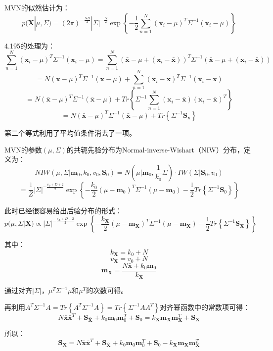 \documentclass[UTF8]{ctexart}
\begin{document}
MVN的似然估计为：
$$p(\textbf{X}|\mu,\Sigma) = (2\pi)^{-\frac{ND}{2}}|\Sigma|^{-\frac{N}{2}}\exp\left\{ -\frac{1}{2}\sum_{n=1}^{N}(\textbf{x}_{i}-\mu)^{T}\Sigma^{-1}(\textbf{x}_{i}-\mu) \right\}$$

4.195的处理为：
$$\sum_{n=1}^{N}(\textbf{x}_{i}-\mu)^{T}\Sigma^{-1}(\textbf{x}_{i}-\mu) =\sum_{n=1}^{N}(\bar{\textbf{x}} - \mu + (\textbf{x}_{i} - \bar{\textbf{x}}))^{T}\Sigma^{-1}(\bar{\textbf{x}} - \mu + (\textbf{x}_{i} - \bar{\textbf{x}})) $$
$$=N(\bar{\textbf{x}}-\mu)^{T}\Sigma^{-1}(\bar{\textbf{x}}-\mu) + \sum_{n=1}^{N}(\textbf{x}_{i} - \bar{\textbf{x}})^{T}\Sigma^{-1}(\textbf{x}_{i}-\bar{\textbf{x}})$$
$$=N(\bar{\textbf{x}}-\mu)^{T}\Sigma^{-1}(\bar{\textbf{x}}-\mu) + Tr\left\{\Sigma^{-1}\sum_{n=1}^{N}(\textbf{x}_{i}-\bar{\textbf{x}})(\textbf{x}_{i} - \bar{\textbf{x}})^{T}\right\}$$
$$=N(\bar{\textbf{x}}-\mu)^{T}\Sigma^{-1}(\bar{\textbf{x}}-\mu) + Tr\left\{ \Sigma^{-1} \textbf{S}_{\bar{\textbf{x}}}\right\}$$

第二个等式利用了平均值条件消去了一项。

MVN的参数$(\mu,\Sigma)$的共轭先验分布为Normal-inverse-Wishart（NIW）分布，定义为：
$$NIW(\mu,\Sigma|\textbf{m}_{0},k_{0},v_{0},\textbf{S}_{0}) = N(\mu|\textbf{m}_{0},\frac{1}{k_{0}}\Sigma)\cdot IW(\Sigma|\textbf{S}_{0},v_{0})$$
$$=\frac{1}{Z} |\Sigma|^{-\frac{v_{0} + D + 2}{2}}\exp\left\{ -\frac{k_{0}}{2}(\mu-\textbf{m}_{0})^{T}\Sigma^{-1}(\mu-\textbf{m}_{0})-\frac{1}{2}Tr\left\{ \Sigma^{-1}\textbf{S}_{0} \right\} \right\}$$

此时已经很容易给出后验分布的形式：
$$p(\mu,\Sigma|\textbf{X}) \propto |\Sigma|^{-\frac{v_{\textbf{X}}+D+2}{2}}\exp\left\{ -\frac{k_{\textbf{X}}}{2}(\mu-\textbf{m}_{\textbf{X}})^{T}\Sigma^{-1}(\mu-\textbf{m}_{\textbf{X}}) - \frac{1}{2}Tr\left\{  \Sigma^{-1} \textbf{S}_{\textbf{X}}\right\} \right\}$$

其中：
$$k_{\textbf{X}} = k_{0} + N$$
$$v_{\textbf{X}} = v_{0} + N$$
$$\textbf{m}_{\textbf{X}} = \frac{N\bar{\textbf{x}}+k_{0}\textbf{m}_{0}}{k_{\textbf{X}}}$$

通过对齐$|\Sigma|$，$\mu^{T}\Sigma^{-1}\mu$和$\mu^{T}$的次数可得。

再利用$A^{T}\Sigma^{-1}A = Tr\left\{ A^{T}\Sigma^{-1}A \right\} = Tr\left\{ \Sigma^{-1}AA^{T} \right\}$对齐幂函数中的常数项可得：
$$N \bar{\textbf{x}} \bar{\textbf{x}}^{T} + \textbf{S}_{\bar{\textbf{X}}} + k_{0}\textbf{m}_{0}\textbf{m}_{0}^{T} + \textbf{S}_{0} = k_{\textbf{X}}\textbf{m}_{\textbf{X}}\textbf{m}_{\textbf{X}}^{T} + \textbf{S}_{\textbf{X}}$$

所以：
$$\textbf{S}_{\textbf{X}} = N \bar{\textbf{x}} \bar{\textbf{x}}^{T} + \textbf{S}_{\bar{\textbf{X}}} + k_{0}\textbf{m}_{0}\textbf{m}_{0}^{T} + \textbf{S}_{0} - k_{\textbf{X}}\textbf{m}_{\textbf{X}}\textbf{m}_{\textbf{X}}^{T} $$
\end{document}
